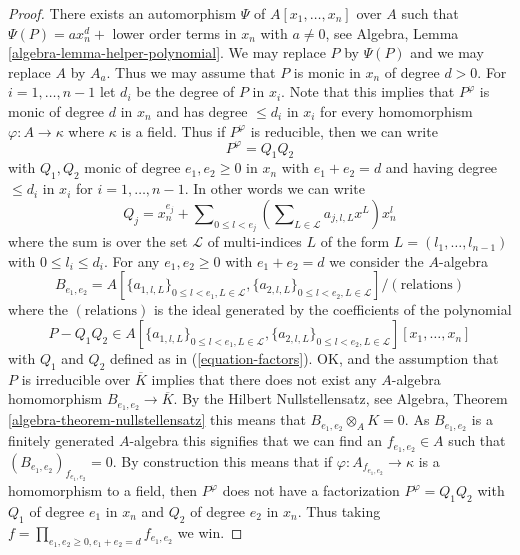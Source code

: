 \begin{proof}
There exists an automorphism $\Psi$ of $A[x_1, \ldots, x_n]$ over $A$
such that $\Psi(P) = ax_n^d +$ lower order terms in $x_n$ with
$a \not = 0$, see
Algebra, Lemma \ref{algebra-lemma-helper-polynomial}.
We may replace $P$ by $\Psi(P)$ and we may replace $A$ by $A_a$.
Thus we may assume that $P$ is monic in $x_n$ of degree $d > 0$.
For $i = 1, \ldots, n - 1$ let $d_i$ be the degree of $P$ in $x_i$.
Note that this implies that $P^\varphi$ is monic of degree $d$ in $x_n$
and has degree $\leq d_i$ in $x_i$ for every homomorphism
$\varphi : A \to \kappa$ where $\kappa$ is a field.
Thus if $P^\varphi$ is reducible, then we can write
$$
P^\varphi = Q_1 Q_2
$$
with $Q_1, Q_2$ monic of degree $e_1, e_2 \geq 0$ in $x_n$ with
$e_1 + e_2 = d$ and having degree $\leq d_i$ in $x_i$ for
$i = 1, \ldots, n - 1$. In other words we can write
\begin{equation}
\label{equation-factors}
Q_j = x_n^{e_j} + \sum\nolimits_{0 \leq l < e_j}
\left( \sum\nolimits_{L \in \mathcal{L}} a_{j, l, L} x^L \right) x_n^l
\end{equation}
where the sum is over the set $\mathcal{L}$ of multi-indices $L$
of the form $L = (l_1, \ldots, l_{n - 1})$ with $0 \leq l_i \leq d_i$.
For any $e_1, e_2 \geq 0$ with $e_1 + e_2 = d$ we consider the $A$-algebra
$$
B_{e_1, e_2} =
A[\{a_{1, l, L}\}_{0 \leq l < e_1, L \in \mathcal{L}},
\{a_{2, l, L}\}_{0 \leq l < e_2, L \in \mathcal{L}}]/(\text{relations})
$$
where the $(\text{relations})$ is the ideal generated by the coefficients
of the polynomial
$$
P - Q_1Q_2 \in
A[\{a_{1, l, L}\}_{0 \leq l < e_1, L \in \mathcal{L}},
\{a_{2, l, L}\}_{0 \leq l < e_2, L \in \mathcal{L}}][x_1, \ldots, x_n]
$$
with $Q_1$ and $Q_2$ defined as in (\ref{equation-factors}). OK, and
the assumption that $P$ is irreducible over $\overline{K}$ implies that
there does not exist any $A$-algebra homomorphism
$B_{e_1, e_2} \to \overline{K}$. By the Hilbert Nullstellensatz, see
Algebra, Theorem \ref{algebra-theorem-nullstellensatz}
this means that $B_{e_1, e_2} \otimes_A K = 0$.
As $B_{e_1, e_2}$ is a finitely generated $A$-algebra this signifies that
we can find an $f_{e_1, e_2} \in A$ such that
$(B_{e_1, e_2})_{f_{e_1, e_2}} = 0$. By construction this means that
if $\varphi : A_{f_{e_1, e_2}} \to \kappa$ is a homomorphism to a field,
then $P^\varphi$ does not have a factorization $P^\varphi = Q_1 Q_2$
with $Q_1$ of degree $e_1$ in $x_n$ and $Q_2$ of degree $e_2$ in $x_n$.
Thus taking
$f = \prod_{e_1, e_2 \geq 0, e_1 + e_2 = d} f_{e_1, e_2}$ we win.
\end{proof}

